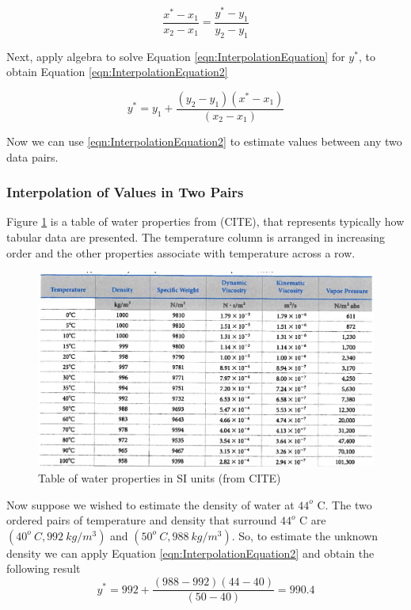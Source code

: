 \begin{equation}
\frac{x^*-x_1}{x_2-x_1}=\frac{y^*-y_1}{y_2-y_1}
\label{eqn:InterpolationEquation}
\end{equation}

Next, apply algebra to solve Equation \ref{eqn:InterpolationEquation} for $y^*$, to obtain Equation \ref{eqn:InterpolationEquation2}

\begin{equation}
y^*=y_1+\frac{(y_2-y_1)(x^*-x_1)}{(x_2-x_1)}
\label{eqn:InterpolationEquation2}
\end{equation}

Now we can use \ref{eqn:InterpolationEquation2} to estimate values between any two data pairs.\\

\subsubsection{Interpolation of Values in Two Pairs}

Figure \ref{fig:FluidData} is a table of water properties from (CITE), that represents typically how tabular data are presented.  The temperature column is arranged in increasing order and the other properties associate with temperature across a row.

\begin{figure}[htbp] %
   \centering
   \includegraphics[width=6in]{./2-Algorithms/FluidData.jpg} 
   \caption{Table of water properties in SI units (from CITE)}
   \label{fig:FluidData}
\end{figure}

Now suppose we wished to estimate the density of water at $44^o$ C.  
The two ordered pairs of temperature and density that surround $44^o$ C are $(40^o~C,992~kg/m^3)$ and $(50^o~C,988~kg/m^3)$.
So, to estimate the unknown density we can apply Equation \ref{eqn:InterpolationEquation2} and obtain the following result
\begin{equation}
y^*=992+\frac{(988-992)(44-40)}{(50-40)}=990.4
\label{eqn:DensityInterpolation}
\end{equation}

